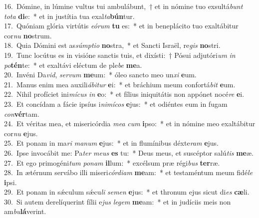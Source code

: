 {16.~}Dómine, in lúmine vultus tui ambulábunt,~† et in nómine tuo exsultá\textit{bunt} \textit{to}\textit{ta} \textbf{di}e:~* et in justítia tua exal\textit{ta}\textbf{bún}tur.\\
{17.~}Quóniam glória virtútis \textit{e}\textit{ó}\textit{rum} \textbf{tu} es:~* et in beneplácito tuo exaltábitur cor\textit{nu} \textbf{no}strum.\\
{18.~}Quia Dómini est as\textit{súm}\textit{pti}\textit{o} \textbf{no}stra,~* et Sancti Israël, re\textit{gis} \textbf{no}stri.\\
{19.~}Tunc locútus es in visióne sanctis tuis, et dixísti:~† Pósui adjutóri\textit{um} \textit{in} \textit{po}\textbf{tén}te:~* et exaltávi eléctum de ple\textit{be} \textbf{me}a.\\
{20.~}Invéni Da\textit{vid}, \textit{ser}\textit{vum} \textbf{me}um:~* óleo sancto meo un\textit{xi} \textbf{e}um.\\
{21.~}Manus enim mea auxili\textit{á}\textit{bi}\textit{tur} \textbf{e}i:~* et bráchium meum confortá\textit{bit} \textbf{e}um.\\
{22.~}Nihil profíciet ini\textit{mí}\textit{cus} \textit{in} \textbf{e}o:~* et fílius iniquitátis non appónet nocé\textit{re} \textbf{e}i.\\
{23.~}Et concídam a fácie ipsíus i\textit{ni}\textit{mí}\textit{cos} \textbf{e}jus:~* et odiéntes eum in fugam \textit{con}\textbf{vér}tam.\\
{24.~}Et véritas mea, et misericórdia \textit{me}\textit{a} \textit{cum} \textbf{i}pso:~* et in nómine meo exaltábitur cor\textit{nu} \textbf{e}jus.\\
{25.~}Et ponam in ma\textit{ri} \textit{ma}\textit{num} \textbf{e}jus:~* et in flumínibus déxte\textit{ram} \textbf{e}jus.\\
{26.~}Ipse invocábit me: Pa\textit{ter} \textit{me}\textit{us} \textbf{es} tu:~* Deus meus, et suscéptor salú\textit{tis} \textbf{me}æ.\\
{27.~}Et ego primogéni\textit{tum} \textit{po}\textit{nam} \textbf{il}lum:~* excélsum præ régi\textit{bus} \textbf{ter}ræ.\\
{28.~}In ætérnum servábo illi miseri\textit{cór}\textit{di}\textit{am} \textbf{me}am:~* et testaméntum meum fidé\textit{le} \textbf{i}psi.\\
{29.~}Et ponam in sǽculum sǽcu\textit{li} \textit{se}\textit{men} \textbf{e}jus:~* et thronum ejus sicut di\textit{es} \textbf{cæ}li.\\
{30.~}Si autem derelíquerint fílii e\textit{jus} \textit{le}\textit{gem} \textbf{me}am:~* et in judíciis meis non am\textit{bu}\textbf{lá}verint.\\
